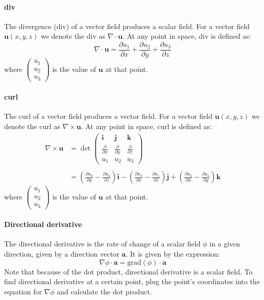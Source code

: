 \documentclass{scrartcl}
\renewcommand{\vec}[1]{\mathbf{#1}}
\begin{document}
\paragraph{div}
The divergence (div) of a vector field produces a scalar field. For a vector field $ \vec{u}(x, y, z) $ we denote the div as $ \nabla \cdot \vec{u} $. At any point in space, div is defined as:
\begin{equation}
\nabla \cdot \vec{u} = \frac{\partial u_{1}}{\partial x} + \frac{\partial u_{2}}{\partial y} + \frac{\partial u_{3}}{\partial z}
\end{equation}
where $ \begin{pmatrix}
u_{1} \\ u_{2} \\ u_{3}
\end{pmatrix} $ is the value of $ \vec{u} $ at that point.

\paragraph{curl}
The curl of a vector field produces a vector field. For a vector field $ \vec{u}(x, y, z) $ we denote the curl as $ \nabla \times \vec{u} $. At any point in space, curl is defined as:
\begin{align}
\nabla \times \vec{u} & = \det \begin{pmatrix}
\vec{i} & \vec{j} & \vec{k} \\
\frac{\partial}{\partial x} & \frac{\partial}{\partial y} & \frac{\partial}{\partial z} \\
u_{1} & u_{2} & u_{3}
\end{pmatrix} \\\\
& = (\frac{\partial u_{3}}{\partial y} - \frac{\partial u_{2}}{\partial z})\vec{i} - (\frac{\partial u_{3}}{\partial x} - \frac{\partial u_{1}}{\partial z})\vec{j} + (\frac{\partial u_{2}}{\partial x} - \frac{\partial u_{1}}{\partial y})\vec{k}
\end{align}
where $ \begin{pmatrix}
u_{1} \\ u_{2} \\ u_{3}
\end{pmatrix} $ is the value of $ \vec{u} $ at that point.

\paragraph{Directional derivative}
The directional derivative is the rate of change of a scalar field $ \phi $ in a given direction, given by a direction vector $ \vec{a} $. It is given by the expression:
\begin{equation}
\nabla \phi \cdot \vec{a} = \textrm{grad} (\phi) \cdot \vec{a}
\end{equation}
Note that because of the dot product, directional derivative is a scalar field. To find directional derivative at a certain point, plug the point's coordinates into the equation for $ \nabla \phi $ and calculate the dot product.
\end{document}
